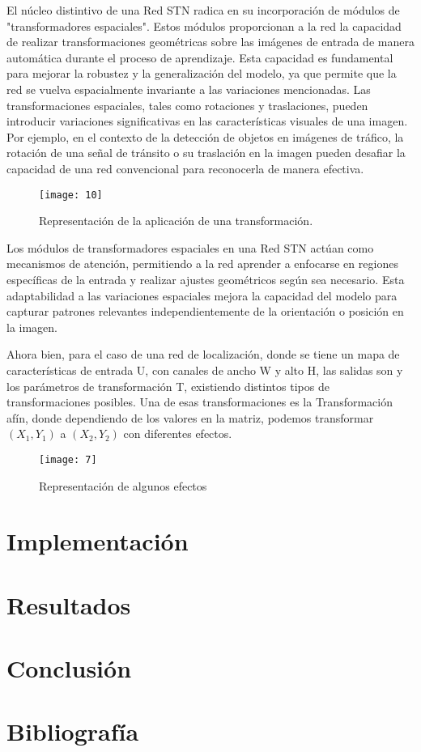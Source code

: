 	El núcleo distintivo de una Red STN radica en su incorporación de módulos de "transformadores espaciales". Estos módulos proporcionan a la red la capacidad de realizar transformaciones geométricas sobre las imágenes de entrada de manera automática durante el proceso de aprendizaje. Esta capacidad es fundamental para mejorar la robustez y la generalización del modelo, ya que permite que la red se vuelva espacialmente invariante a las variaciones mencionadas.
Las transformaciones espaciales, tales como rotaciones y traslaciones, pueden introducir variaciones significativas en las características visuales de una imagen. Por ejemplo, en el contexto de la detección de objetos en imágenes de tráfico, la rotación de una señal de tránsito o su traslación en la imagen pueden desafiar la capacidad de una red convencional para reconocerla de manera efectiva.
	
	\vspace{0.3cm}
	\begin{figure}[ht]
	    \centering
		\texttt{[image: 10]}
		\caption{Representación de la aplicación de una transformación.}
	\end{figure}
	\vspace{0.3cm}

	Los módulos de transformadores espaciales en una Red STN actúan como mecanismos de atención, permitiendo a la red aprender a enfocarse en regiones específicas de la entrada y realizar ajustes geométricos según sea necesario. Esta adaptabilidad a las variaciones espaciales mejora la capacidad del modelo para capturar patrones relevantes independientemente de la orientación o posición en la imagen.
	
	Ahora bien, para el caso de una red de localización, donde se tiene un mapa de características de entrada U, con canales de ancho W y alto H, las salidas son  y los parámetros de transformación T, existiendo distintos tipos de transformaciones posibles. Una de esas transformaciones es la Transformación afín, donde dependiendo de los valores en la matriz, podemos transformar $(X_1, Y_1)$ a $(X_2, Y_2)$ con diferentes efectos.

	\begin{figure}[ht]
	    \centering
		\texttt{[image: 7]}
		\caption{Representación de algunos efectos}
	\end{figure}
	

	




\section{Implementación}
\section{Resultados}
\section{Conclusión}
\section{Bibliografía}
